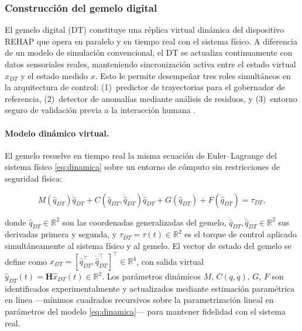 \documentclass[a4paper,12pt]{article}
\begin{document}
\subsubsection{Construcción del gemelo digital}
\label{sec:gemelo_digital}

El gemelo digital (DT) constituye una réplica virtual dinámica del dispositivo REHAP que opera en paralelo y en tiempo real con el sistema físico. A diferencia de un modelo de simulación convencional, el DT se actualiza continuamente con datos sensoriales reales, manteniendo sincronización activa entre el estado virtual $\hat{x}_{DT}$ y el estado medido $x$. Esto le permite desempeñar tres roles simultáneos en la arquitectura de control: (1)~predictor de trayectorias para el gobernador de referencia, (2)~detector de anomalías mediante análisis de residuos, y (3)~entorno seguro de validación previa a la interacción humana \citep{gil_model-based_2025, mazumder_next_2023}.

\paragraph{Modelo dinámico virtual.}
El gemelo resuelve en tiempo real la misma ecuación de Euler–Lagrange del sistema físico \eqref{eq:dinamica} sobre un entorno de cómputo sin restricciones de seguridad física:

\begin{equation}
    M(\hat{q}_{DT})\ddot{\hat{q}}_{DT}
    + C(\hat{q}_{DT},\dot{\hat{q}}_{DT})\dot{\hat{q}}_{DT}
    + G(\hat{q}_{DT}) + F(\dot{\hat{q}}_{DT}) = \tau_{DT},
    \label{eq:dt_dinamica}
\end{equation}

\noindent donde $\hat{q}_{DT}\in\mathbb{R}^{2}$ son las coordenadas generalizadas del gemelo, $\dot{\hat{q}}_{DT},\ddot{\hat{q}}_{DT}\in\mathbb{R}^{2}$ sus derivadas primera y segunda, y $\tau_{DT}=\tau(t)\in\mathbb{R}^{2}$ es el torque de control aplicado simultáneamente al sistema físico y al gemelo. El vector de estado del gemelo se define como $\hat{x}_{DT}=[\hat{q}_{DT}^{\top},\dot{\hat{q}}_{DT}^{\top}]^{\top}\in\mathbb{R}^{4}$, con salida virtual $\hat{y}_{DT}(t)=\mathbf{H}\hat{x}_{DT}(t)\in\mathbb{R}^{2}$. Los parámetros dinámicos $M$, $C(q,\dot{q})$, $G$, $F$ son identificados experimentalmente y actualizados mediante estimación paramétrica en línea ---mínimos cuadrados recursivos sobre la parametrización lineal en parámetros del modelo \eqref{eq:dinamica}--- para mantener fidelidad con el sistema real.
\end{document}
